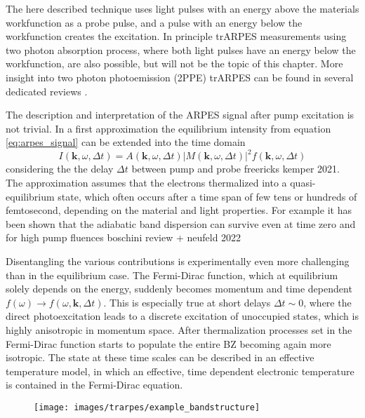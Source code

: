 The here described technique uses light pulses with an energy above the materials workfunction as a probe pulse, and a pulse with an energy below the workfunction creates the excitation.
In principle trARPES measurements using two photon absorption process, where both light pulses have an energy below the workfunction, are also possible, but will not be the topic of this chapter.
More insight into two photon photoemission (2PPE) trARPES can be found in several dedicated reviews \cite{}.

The description and interpretation of the ARPES signal after pump excitation is not trivial.
In a first approximation the equilibrium intensity from equation \ref{eq:arpes_signal} can be extended into the time domain
\begin{equation}
	I(\mathbf{k}, \omega, \Delta t) = A(\mathbf{k}, \omega, \Delta t)\left|M(\mathbf{k}, \omega, \Delta t)\right|^2f(\mathbf{k}, \omega, \Delta t)
\end{equation}
considering the the delay  $\Delta t$ between pump and probe \cite{} freericks kemper 2021.
The approximation assumes that the electrons thermalized into a quasi-equilibrium state, which often occurs after a time span of few tens or hundreds of femtosecond, depending on the material and light properties.
For example it has been shown that the adiabatic band dispersion can survive even at time zero and for high pump fluences \cite{} boschini review + neufeld 2022

Disentangling the various contributions is experimentally even more challenging than in the equilibrium case.
The Fermi-Dirac function, which at equilibrium solely depends on the energy, suddenly becomes momentum and time dependent $f(\omega) \rightarrow f(\omega, \mathbf{k}, \Delta t)$.
This is especially true at short delays $\Delta t \sim 0$, where the direct photoexcitation leads to a discrete excitation of unoccupied states, which is highly anisotropic in momentum space.
After thermalization processes set in the Fermi-Dirac function starts to populate the entire BZ becoming again more isotropic.
The state at these time scales can be described in an effective temperature model, in which an effective, time dependent electronic temperature is contained in the Fermi-Dirac equation.

\begin{figure}
	\centering
	\texttt{[image: images/trarpes/example\_bandstructure]}
	\caption{}
	\label{fig:example_bandstructure}
\end{figure}


